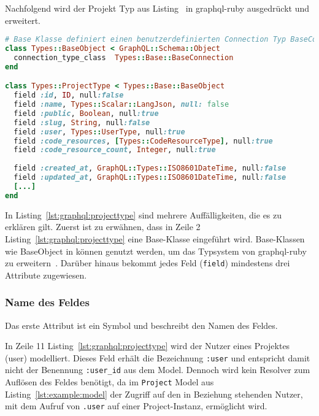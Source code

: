 Nachfolgend wird der Projekt Typ aus Listing~ in graphql-ruby ausgedrückt und erweitert.

\begin{lstlisting}[language=Ruby,float=h!,caption={Definition des ProjectTypes zum Abbilden von Project Model Instanzen}, label={lst:graphql:projecttype}]
# Base Klasse definiert einen benutzerdefinierten Connection Typ BaseConnection 
class Types::BaseObject < GraphQL::Schema::Object
  connection_type_class  Types::Base::BaseConnection
end

class Types::ProjectType < Types::Base::BaseObject
  field :id, ID, null:false
  field :name, Types::Scalar::LangJson, null: false
  field :public, Boolean, null:true
  field :slug, String, null:false
  field :user, Types::UserType, null:true
  field :code_resources, [Types::CodeResourceType], null:true
  field :code_resource_count, Integer, null:true
  
  field :created_at, GraphQL::Types::ISO8601DateTime, null:false
  field :updated_at, GraphQL::Types::ISO8601DateTime, null:false
  [...]
end
\end{lstlisting}

In Listing~\ref{lst:graphql:projecttype} sind mehrere Auffälligkeiten, die es zu erklären gilt.
Zuerst ist zu erwähnen, dass in Zeile 2 Listing~\ref{lst:graphql:projecttype} eine Base-Klasse eingeführt wird. Base-Klassen wie BaseObject in können genutzt werden, um das Typsystem von graphql-ruby zu erweitern~\cite{graphql-extending}. 
Darüber hinaus bekommt jedes Feld (\texttt{field}) mindestens drei Attribute zugewiesen. 

\subsubsection{Name des Feldes}
Das erste Attribut ist ein Symbol und beschreibt den Namen des Feldes. 

In Zeile 11 Listing~\ref{lst:graphql:projecttype} wird der Nutzer eines Projektes (user) modelliert. Dieses Feld erhält die Bezeichnung \texttt{:user} und entspricht damit nicht der Benennung \texttt{:user\_id} aus dem Model. Dennoch wird kein Resolver zum Auflösen des Feldes benötigt, da im \texttt{Project} Model aus Listing~\ref{lst:example:model} der Zugriff auf den in Beziehung stehenden Nutzer, mit dem Aufruf von \texttt{.user} auf einer Project-Instanz, ermöglicht wird. 

